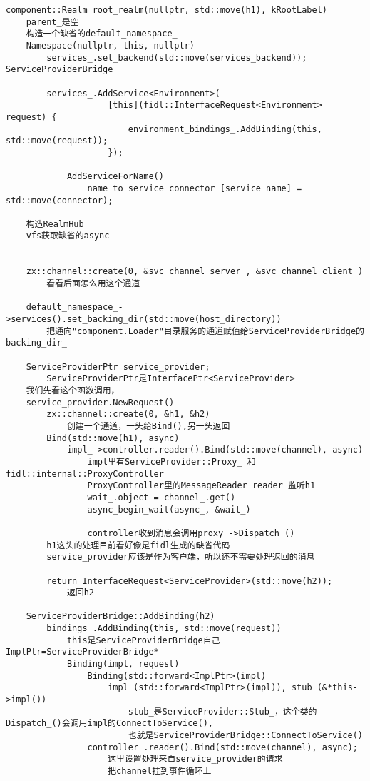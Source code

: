 \begin{verbatim}
component::Realm root_realm(nullptr, std::move(h1), kRootLabel)
    parent_是空
    构造一个缺省的default_namespace_
    Namespace(nullptr, this, nullptr)
        services_.set_backend(std::move(services_backend));   ServiceProviderBridge

        services_.AddService<Environment>(
                    [this](fidl::InterfaceRequest<Environment> request) {
                        environment_bindings_.AddBinding(this, std::move(request));
                    });

            AddServiceForName()
                name_to_service_connector_[service_name] = std::move(connector);

    构造RealmHub
    vfs获取缺省的async


    zx::channel::create(0, &svc_channel_server_, &svc_channel_client_)
        看看后面怎么用这个通道

    default_namespace_->services().set_backing_dir(std::move(host_directory))
        把通向"component.Loader"目录服务的通道赋值给ServiceProviderBridge的backing_dir_
      
    ServiceProviderPtr service_provider;
        ServiceProviderPtr是InterfacePtr<ServiceProvider>
    我们先看这个函数调用，
    service_provider.NewRequest()
        zx::channel::create(0, &h1, &h2)
            创建一个通道，一头给Bind(),另一头返回
        Bind(std::move(h1), async) 
            impl_->controller.reader().Bind(std::move(channel), async)
                impl里有ServiceProvider::Proxy_ 和  fidl::internal::ProxyController
                ProxyController里的MessageReader reader_监听h1
                wait_.object = channel_.get()
                async_begin_wait(async_, &wait_)

                controller收到消息会调用proxy_->Dispatch_()
        h1这头的处理目前看好像是fidl生成的缺省代码
        service_provider应该是作为客户端，所以还不需要处理返回的消息
        
        return InterfaceRequest<ServiceProvider>(std::move(h2));
            返回h2

    ServiceProviderBridge::AddBinding(h2)
        bindings_.AddBinding(this, std::move(request))
            this是ServiceProviderBridge自己 ImplPtr=ServiceProviderBridge*
            Binding(impl, request)
                Binding(std::forward<ImplPtr>(impl)
                    impl_(std::forward<ImplPtr>(impl)), stub_(&*this->impl())
                        stub_是ServiceProvider::Stub_，这个类的Dispatch_()会调用impl的ConnectToService(),
                        也就是ServiceProviderBridge::ConnectToService()
                controller_.reader().Bind(std::move(channel), async);
                    这里设置处理来自service_provider的请求
                    把channel挂到事件循环上
            

\end{verbatim}
